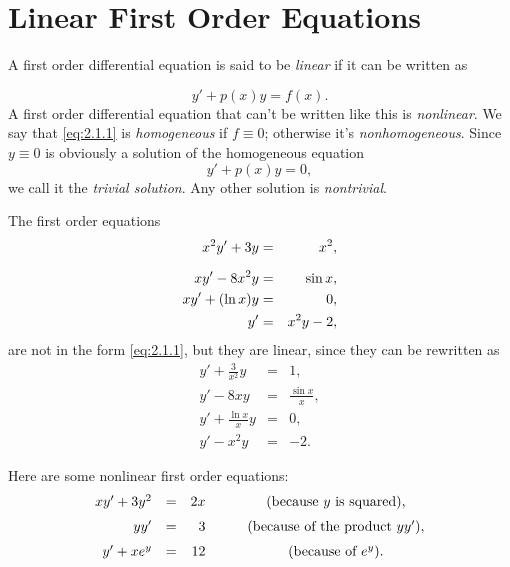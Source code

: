 \section{Linear First Order Equations}

\noindent
A first order differential equation is said to be {\color{blue}\it linear\/} if it can be written as

\begin{equation}
  \label{eq:2.1.1}y'+p(x)y=f(x).
\end{equation}
A first order differential equation that can't be written like this is {\color{blue}\it
nonlinear\/}. We say that \eqref{eq:2.1.1} is {\color{blue}\it homogeneous\/} if $f\equiv0$;
otherwise it's {\color{blue}\it nonhomogeneous\/}. Since $y\equiv0$ is obviously a solution of the
homogeneous equation
\[
  y'+p(x)y=0,
\]
we call it the {\color{blue}\it trivial solution\/}. Any other solution is {\color{blue}\it
nontrivial\/}.

\begin{example}
  \label{example:2.1.1}\rm The first order equations
  \begin{eqnarray*}
    x^{2}y'+3y   & = & x^{2},  \\[2\jot]
    xy'-8x^{2}y  & = & \sin x, \\
    xy'+(\ln x)y & = & 0,      \\
    y'           & = & x^{2}y-2,
  \end{eqnarray*}
  are not in the form \eqref{eq:2.1.1}, but they are linear, since they can be rewritten as
  \begin{eqnarray*}
    y'+\frac{3}{x^{2}}y & = & 1,                \\
    y'-8xy              & = & \frac{\sin x}{x}, \\
    y'+\frac{\ln x}{x}y & = & 0,                \\
    y'-x^{2}y           & = & -2.
  \end{eqnarray*}
\end{example}

\begin{example}
  \label{example:2.1.2}\rm Here are some nonlinear first order equations:
  \[
    \begin{array}{rcrc}
      xy'+3y^{2} & = & 2x & \qquad\mbox{(because $y$ is squared)},       \\[2\jot]
      yy'        & = & 3  & \qquad\mbox{(because of the product $yy'$)}, \\[2\jot]
      y'+xe^{y}  & = & 12 & \qquad\mbox{(because of $e^{y}$)}.
    \end{array}
  \]
\end{example}

